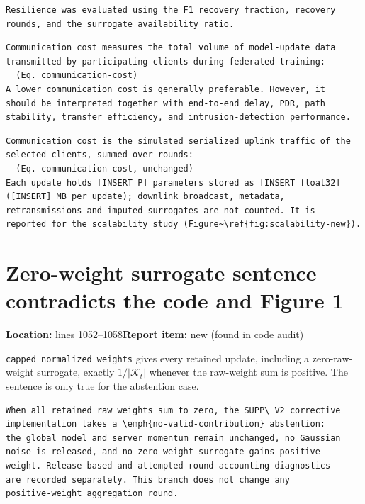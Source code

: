 \documentclass[10pt,a4paper]{article}
\newcommand{\issue}[3]{\section{#1}{\raggedright\noindent\textcolor{note}{\small\textbf{Location:} #2\quad\textbf{Report item:} #3}\par}\smallskip}
\newcommand{\why}[1]{\noindent\textcolor{note}{\small #1}\par\smallskip}
\begin{document}
\begin{after}
\begin{Verbatim}
Resilience was evaluated using the F1 recovery fraction, recovery
rounds, and the surrogate availability ratio.
\end{Verbatim}
\end{after}

\begin{before}[lines 1678--1695]
\begin{Verbatim}
Communication cost measures the total volume of model-update data
transmitted by participating clients during federated training:
  (Eq. communication-cost)
A lower communication cost is generally preferable. However, it
should be interpreted together with end-to-end delay, PDR, path
stability, transfer efficiency, and intrusion-detection performance.
\end{Verbatim}
\end{before}

\begin{after}
\begin{Verbatim}
Communication cost is the simulated serialized uplink traffic of the
selected clients, summed over rounds:
  (Eq. communication-cost, unchanged)
Each update holds [INSERT P] parameters stored as [INSERT float32]
([INSERT] MB per update); downlink broadcast, metadata,
retransmissions and imputed surrogates are not counted. It is
reported for the scalability study (Figure~\ref{fig:scalability-new}).
\end{Verbatim}
\end{after}

\issue{Zero-weight surrogate sentence contradicts the code and Figure 1}{lines 1052--1058}{new (found in code audit)}
\why{\texttt{capped\_normalized\_weights} gives every retained update, including a zero-raw-weight surrogate, exactly $1/|\mathcal K_t|$ whenever the raw-weight sum is positive. The sentence is only true for the abstention case.}

\begin{before}[lines 1052--1058]
\begin{Verbatim}
When all retained raw weights sum to zero, the SUPP\_V2 corrective
implementation takes a \emph{no-valid-contribution} abstention:
the global model and server momentum remain unchanged, no Gaussian
noise is released, and no zero-weight surrogate gains positive
weight. Release-based and attempted-round accounting diagnostics
are recorded separately. This branch does not change any
positive-weight aggregation round.
\end{Verbatim}
\end{before}
\end{document}

